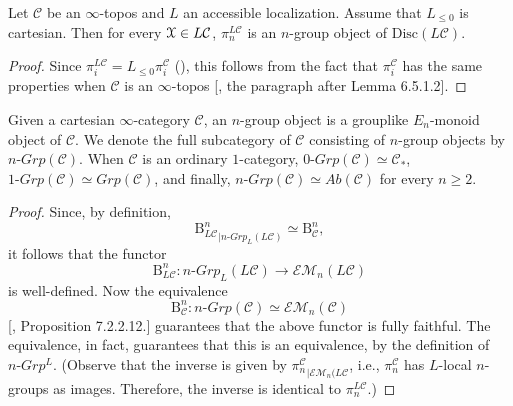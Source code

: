 \begin{lem}
 Let $\mathcal{C}$ be an $\infty$-topos and $L$ an accessible localization. Assume that $L_{\leq 0}$ is cartesian. Then for every $\EuScript{X}\in L\mathcal{C}$, $\pi_n^{L\mathcal{C}}$ is an $n$-group object of $\mathrm{Disc}(L\mathcal{C})$.
\end{lem} 
\begin{proof}
Since $\pi_i^{L\mathcal{C}}=L_{\leq 0}\pi_i^\mathcal{C}$ (), this follows from the fact that $\pi_i^\mathcal{C}$ has the same properties when $\mathcal{C}$ is an $\infty$-topos [\cite{lurie2009higher}, the paragraph after Lemma 6.5.1.2].
\end{proof} 
Given a cartesian $\infty$-category $\mathcal{C}$, an $n$-group object is a grouplike $E_n$-monoid object of $\mathcal{C}$. We denote the full subcategory of $\mathcal{C}$ consisting of $n$-group objects by $n\mbox{-}Grp(\mathcal{C})$. When $\mathcal{C}$ is an ordinary $1$-category, $0\mbox{-}Grp(\mathcal{C})\simeq \mathcal{C}_*$, $1\mbox{-}Grp(\mathcal{C})\simeq Grp(\mathcal{C})$, and finally, $n\mbox{-}Grp(\mathcal{C})\simeq Ab(\mathcal{C})$ for every $n\geq 2$.

\begin{proof}
 Since, by definition, $${\mathrm{B}^n_{L\mathcal{C}}}_{|n\mbox{-}Grp_L(L\mathcal{C})}\simeq\mathrm{B}^n_\mathcal{C}, $$ it follows that the functor $$\mathrm{B}^n_{L\mathcal{C}}: n\mbox{-}Grp_L(L\mathcal{C})\to\mathcal{EM}_n(L\mathcal{C})$$ is well-defined. Now the equivalence  $$\mathrm{B}^n_{\mathcal{C}}: n\mbox{-}Grp(\mathcal{C})\simeq \mathcal{EM}_n(\mathcal{C})$$ [\cite{lurie2009higher}, Proposition 7.2.2.12.] guarantees that the above functor is fully faithful. The equivalence, in fact, guarantees that this is an equivalence, by the definition of $n\mbox{-}Grp^L$. (Observe that the inverse is given by ${\pi_n^\mathcal{C}}_{|\mathcal{EM}_n(L\mathcal{C}}$, i.e., $\pi_n^\mathcal{C}$ has $L$-local $n$-groups as images. Therefore, the inverse is identical to $\pi_n^{L\mathcal{C}}$.) 
\end{proof}

